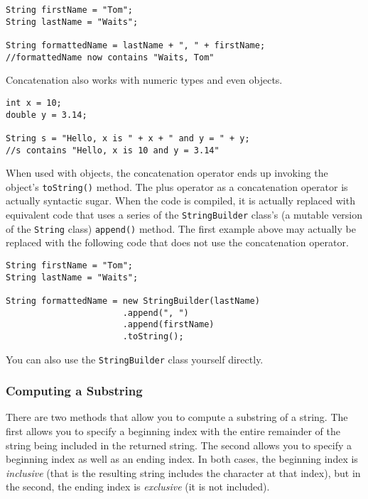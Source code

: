 \begin{verbatim}
String firstName = "Tom";
String lastName = "Waits";

String formattedName = lastName + ", " + firstName;
//formattedName now contains "Waits, Tom"
\end{verbatim}

Concatenation also works with numeric types and even
objects.

\begin{verbatim}
int x = 10;
double y = 3.14;

String s = "Hello, x is " + x + " and y = " + y;
//s contains "Hello, x is 10 and y = 3.14"
\end{verbatim}

When used with objects, the concatenation operator 
ends up invoking the object's \texttt{toString()}
method.  The plus operator as a concatenation operator 
is actually \gls{syntactic sugar}.  When the code is compiled, 
it is actually replaced with equivalent code that uses 
a series of the \texttt{StringBuilder} class's 
(a mutable version of the \texttt{String} class) 
\texttt{append()} method.  The first example
above may actually be replaced with the following code 
that does not use the concatenation operator.

\begin{verbatim}
String firstName = "Tom";
String lastName = "Waits";

String formattedName = new StringBuilder(lastName)
                       .append(", ")
                       .append(firstName)
                       .toString();
\end{verbatim}

You can also use the \texttt{StringBuilder} class
yourself directly.

\subsubsection{Computing a Substring}

There are two methods that allow you to compute
a substring of a string.  The first allows you to
specify a beginning index with the entire remainder
of the string being included in the returned string.
The second allows you to specify a beginning index
as well as an ending index.  In both cases, the
beginning index is \emph{inclusive} (that is the resulting
string includes the character at that index), but
in the second, the ending index is \emph{exclusive}
(it is not included).

